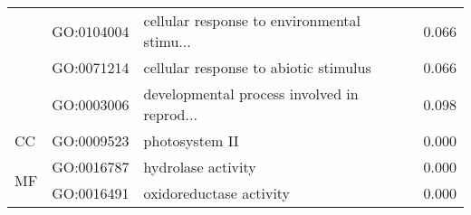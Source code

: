\begin{longtable}{lllr}
   & GO:0104004 &  cellular response to environmental stimu... &         0.066 \\
   & GO:0071214 &        cellular response to abiotic stimulus &         0.066 \\
   & GO:0003006 &  developmental process involved in reprod... &         0.098 \\
\cline{1-4}
CC & GO:0009523 &                               photosystem II &         0.000 \\
\multirow{2}{*}{MF} & GO:0016787 &                           hydrolase activity &         0.000 \\
   & GO:0016491 &                      oxidoreductase activity &         0.000 \\
\end{longtable}
